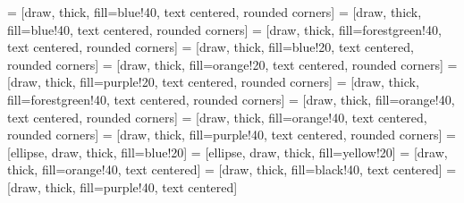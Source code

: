 
  \hspace*{-.5in}
  \begin{minipage}{5in}
  \begin{center}

      \begin{minipage}{4.5in}

     = [draw, thick, fill=blue!40, text centered, rounded corners]
     = [draw, thick, fill=blue!40, text centered, rounded corners]
     = [draw, thick, fill=forestgreen!40, text centered, rounded corners]
     = [draw, thick, fill=blue!20, text centered, rounded corners]
     = [draw, thick, fill=orange!20, text centered, rounded corners]
     = [draw, thick, fill=purple!20, text centered, rounded corners]
     = [draw, thick, fill=forestgreen!40, text centered, rounded corners]
     = [draw, thick, fill=orange!40, text centered, rounded corners]
     = [draw, thick, fill=orange!40, text centered, rounded corners]
     = [draw, thick, fill=purple!40, text centered, rounded corners]
     = [ellipse, draw, thick, fill=blue!20]
     = [ellipse, draw, thick, fill=yellow!20]
     = [draw, thick, fill=orange!40, text centered]  
     = [draw, thick, fill=black!40, text centered]
     = [draw, thick, fill=purple!40, text centered]    

    \begin{figure}

    \begin{center}

\end{center}
\end{figure}
\end{minipage}
\end{center}
\end{minipage}
